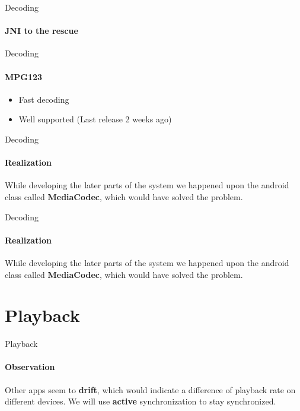 \begin{frame}{Decoding}
	\framesubtitle{JNI to the rescue}
	\centering
\end{frame}

\begin{frame}{Decoding}
	\framesubtitle{MPG123}
	\begin{itemize}
		\item{Fast decoding}
		\item{Well supported (Last release 2 weeks ago)}
	\end{itemize}
\end{frame}

\begin{frame}{Decoding}
	\framesubtitle{Realization}
	While developing the later parts of the system we happened upon the
	android class called \textbf{MediaCodec}, which would have solved
	the problem.
\end{frame}

\begin{frame}{Decoding}
	\framesubtitle{Realization}
	While developing the later parts of the system we happened upon the
	android class called \textbf{MediaCodec}, which would have solved
	the problem.
\end{frame}

\section{Playback}
\begin{frame}{Playback}
	\framesubtitle{Observation}
	Other apps seem to \textbf{drift}, which would indicate a difference
	of playback rate on different devices. We will use \textbf{active}
	synchronization to stay synchronized.
\end{frame}

